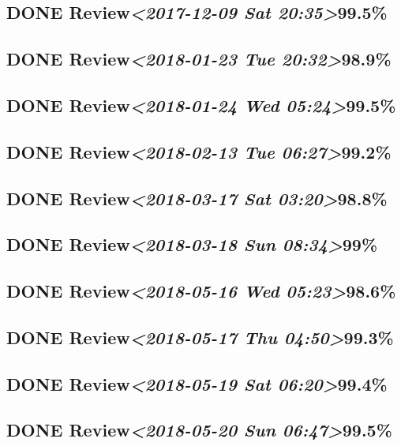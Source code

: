\documentclass[11pt]{ctexart}
\begin{document}
\subsection{{\bfseries\sffamily DONE} Review\textit{<2017-12-09 Sat 20:35>}99.5\%}
\label{sec:orgb3e1efe}
\subsection{{\bfseries\sffamily DONE} Review\textit{<2018-01-23 Tue 20:32>}98.9\%}
\label{sec:orgd0991ca}
\subsection{{\bfseries\sffamily DONE} Review\textit{<2018-01-24 Wed 05:24>}99.5\%}
\label{sec:org40bfebb}
\subsection{{\bfseries\sffamily DONE} Review\textit{<2018-02-13 Tue 06:27>}99.2\%}
\label{sec:orge18d3ca}
\subsection{{\bfseries\sffamily DONE} Review\textit{<2018-03-17 Sat 03:20>}98.8\%}
\label{sec:org4f03e4e}
\subsection{{\bfseries\sffamily DONE} Review\textit{<2018-03-18 Sun 08:34>}99\%}
\label{sec:org745cc4c}
\subsection{{\bfseries\sffamily DONE} Review\textit{<2018-05-16 Wed 05:23>}98.6\%}
\label{sec:org40d6022}
\subsection{{\bfseries\sffamily DONE} Review\textit{<2018-05-17 Thu 04:50>}99.3\%}
\label{sec:orgde3ef91}
\subsection{{\bfseries\sffamily DONE} Review\textit{<2018-05-19 Sat 06:20>}99.4\%}
\label{sec:org06fbb14}
\subsection{{\bfseries\sffamily DONE} Review\textit{<2018-05-20 Sun 06:47>}99.5\%}
\label{sec:orgcbf02ec}
\end{document}
